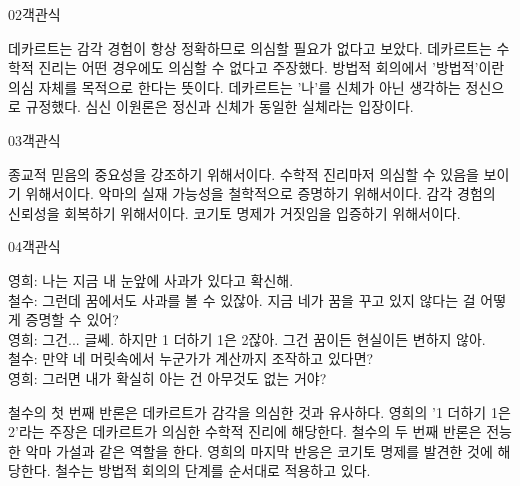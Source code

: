 \documentclass[fs85,seriesWit]{korfarm-base}
\begin{document}
\begin{kfQBlock}{02}{객관식}
\begin{kfChoices}
\kfChoice 데카르트는 감각 경험이 항상 정확하므로 의심할 필요가 없다고 보았다.
\kfChoice 데카르트는 수학적 진리는 어떤 경우에도 의심할 수 없다고 주장했다.
\kfChoice 방법적 회의에서 '방법적'이란 의심 자체를 목적으로 한다는 뜻이다.
\kfChoice 데카르트는 '나'를 신체가 아닌 생각하는 정신으로 규정했다.
\kfChoice 심신 이원론은 정신과 신체가 동일한 실체라는 입장이다.
\end{kfChoices}
\end{kfQBlock}

\begin{kfQBlock}{03}{객관식}
\begin{kfChoices}
\kfChoice 종교적 믿음의 중요성을 강조하기 위해서이다.
\kfChoice 수학적 진리마저 의심할 수 있음을 보이기 위해서이다.
\kfChoice 악마의 실재 가능성을 철학적으로 증명하기 위해서이다.
\kfChoice 감각 경험의 신뢰성을 회복하기 위해서이다.
\kfChoice 코기토 명제가 거짓임을 입증하기 위해서이다.
\end{kfChoices}
\end{kfQBlock}

\begin{kfQBlock}{04}{객관식}
\begin{kfEvidence}영희: 나는 지금 내 눈앞에 사과가 있다고 확신해. \\\relax
철수: 그런데 꿈에서도 사과를 볼 수 있잖아. 지금 네가 꿈을 꾸고 있지 않다는 걸 어떻게 증명할 수 있어? \\\relax
영희: 그건... 글쎄. 하지만 1 더하기 1은 2잖아. 그건 꿈이든 현실이든 변하지 않아. \\\relax
철수: 만약 네 머릿속에서 누군가가 계산까지 조작하고 있다면? \\\relax
영희: 그러면 내가 확실히 아는 건 아무것도 없는 거야?\end{kfEvidence}
\begin{kfChoices}
\kfChoice 철수의 첫 번째 반론은 데카르트가 감각을 의심한 것과 유사하다.
\kfChoice 영희의 '1 더하기 1은 2'라는 주장은 데카르트가 의심한 수학적 진리에 해당한다.
\kfChoice 철수의 두 번째 반론은 전능한 악마 가설과 같은 역할을 한다.
\kfChoice 영희의 마지막 반응은 코기토 명제를 발견한 것에 해당한다.
\kfChoice 철수는 방법적 회의의 단계를 순서대로 적용하고 있다.
\end{kfChoices}
\end{kfQBlock}
\end{document}
